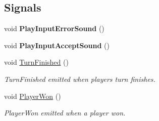 \subsection*{Signals}
\begin{DoxyCompactItemize}
\item 
\hypertarget{classGameManager_a441d3c2600884f3c315a9c5d3db9066d}{void {\bfseries Play\-Input\-Error\-Sound} ()}\label{classGameManager_a441d3c2600884f3c315a9c5d3db9066d}

\item 
\hypertarget{classGameManager_aa6b2e8ebbbeee51512e865d73342cdce}{void {\bfseries Play\-Input\-Accept\-Sound} ()}\label{classGameManager_aa6b2e8ebbbeee51512e865d73342cdce}

\item 
\hypertarget{classGameManager_aba92c2301c45b00826365149ae8c4844}{void \hyperlink{classGameManager_aba92c2301c45b00826365149ae8c4844}{Turn\-Finished} ()}\label{classGameManager_aba92c2301c45b00826365149ae8c4844}

\begin{DoxyCompactList}\small\item\em Turn\-Finished emitted when players turn finishes. \end{DoxyCompactList}\item 
\hypertarget{classGameManager_a46ecd98b835abec58ea2b716b600c453}{void \hyperlink{classGameManager_a46ecd98b835abec58ea2b716b600c453}{Player\-Won} ()}\label{classGameManager_a46ecd98b835abec58ea2b716b600c453}

\begin{DoxyCompactList}\small\item\em Player\-Won emitted when a player won. \end{DoxyCompactList}\end{DoxyCompactItemize}
